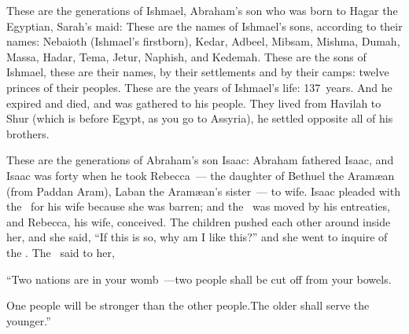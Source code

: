 \begin{inparaenum}
   These are the generations of Ishmael, Abraham's son who was born to Hagar the Egyptian, Sarah's maid:%
   These are the names of Ishmael's sons, according to their names: Nebaioth (Ishmael's firstborn), Kedar, Adbeel, Mibsam,%
   Mishma, Dumah, Massa,%
   Hadar, Tema, Jetur, Naphish, and Kedemah.%
   These are the sons of Ishmael, these are their names, by their settlements and by their camps: twelve princes of their peoples.%
   These are the years of Ishmael's life: 137~years. And he expired and died, and was gathered to his people.%
   They lived from Havilah to Shur (which is before Egypt, as you go to Assyria), he settled opposite all of his brothers.%

   These are the generations of Abraham's son Isaac: Abraham fathered Isaac,%
   and Isaac was forty when he took Rebecca~--- the daughter of Bethuel the Aram\ae an (from Paddan Aram), Laban the Aram\ae an's sister~--- to wife.%
   Isaac pleaded with the \lord\ for his wife because she was barren; and the \lord\ was moved by his entreaties, and Rebecca, his wife, conceived.%
   The children pushed each other around inside her, and she said, ``If this is so, why am I like this?'' and she went to inquire of the \lord.%
   The \lord\ said to her,\smallskip%

  \pd{}``Two nations are in your womb~---\pa{}two people shall be cut off from your bowels.%

  \pd{}One people will be stronger than the other people.\pa{}The older shall serve the younger.''%


\end{inparaenum}
